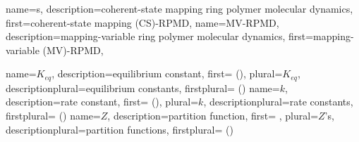 


{
  name={s},
  description={coherent-state mapping ring polymer molecular dynamics},
  first={coherent-state mapping (CS)-RPMD},
}
{
  name={MV-RPMD},
  description={mapping-variable ring polymer molecular dynamics},
  first={mapping-variable (MV)-RPMD},
}


{
  name={$K_{eq}$},
  description={equilibrium constant},
  first={ ()},
  plural={$K_{eq}$},
  descriptionplural={equilibrium constants},
  firstplural={ ()}
}
{
  name={$k$},
  description={rate constant},
  first={ ()},
  plural={$k$},
  descriptionplural={rate constants},
  firstplural={ ()}
}
{
  name={$Z$},
  description={partition function},
  first={ },
  plural={$Z$'s},
  descriptionplural={partition functions},
  firstplural={ ()}
}
